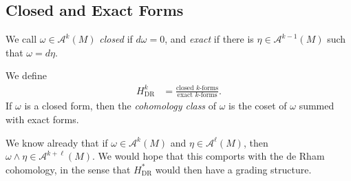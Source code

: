 \documentclass[10pt]{mypackage}
\begin{document}
\subsection{Closed and Exact Forms}%
\begin{definition}
  We call $\omega\in \mathcal{A}^{k}\left( M \right)$ \textit{closed} if $d\omega = 0$, and \textit{exact} if there is $\eta\in \mathcal{A}^{k-1}\left( M \right)$ such that $\omega = d\eta$.\newline

  We define
  \begin{align*}
    H^k_{\operatorname{DR}} &= \frac{\text{closed $k$-forms}}{\text{exact $k$-forms}}.
  \end{align*}
  If $\omega$ is a closed form, then the \textit{cohomology class} of $\omega$ is the coset of $\omega$ summed with exact forms.
\end{definition}
We know already that if $\omega\in \mathcal{A}^{k}\left( M \right)$ and $\eta\in \mathcal{A}^{\ell}\left( M \right)$, then $\omega\wedge\eta \in \mathcal{A}^{k + \ell}\left( M \right)$. We would hope that this comports with the de Rham cohomology, in the sense that $H^{\ast}_{\operatorname{DR}}$ would then have a grading structure.\newline
\end{document}
